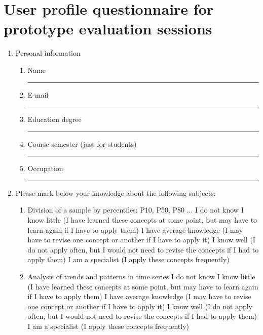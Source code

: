 \newpage

\chapter{User profile questionnaire for prototype evaluation sessions}
\label{chap:profile-form}

\begin{enumerate}
\item Personal information
  \begin{enumerate}
 \item Name
 \newline \rule[0pt]{300pt}{1pt}
 \item E-mail
 \newline \rule[0pt]{300pt}{1pt}
 \item Education degree
 \newline \rule[0pt]{300pt}{1pt}
 \item Course semester (just for students)
 \newline \rule[0pt]{300pt}{1pt}
 \item Occupation
 \newline \rule[0pt]{300pt}{1pt}
  \end{enumerate}
\item Please mark below your knowledge about the following subjects:
	\begin{enumerate}
   \item Division of a sample by percentiles: P10, P50, P80 ...
		\newline {} I do not know
     \newline {} I know little (I have learned these concepts at some point, but may have to learn again if I have to apply them)
     \newline {} I have average knowledge (I may have to revise one concept or another if I have to apply it)
     \newline {} I know well (I do not apply often, but I would not need to revise the concepts if I had to apply them)
     \newline {} I am a specialist (I apply these concepts frequently)
	  \newline 
   \item Analysis of trends and patterns in time series
   \newline {} I do not know
   \newline {} I know little (I have learned these concepts at some point, but may have to learn again if I have to apply them)
   \newline {} I have average knowledge (I may have to revise one concept or another if I have to apply it)
   \newline {} I know well (I do not apply often, but I would not need to revise the concepts if I had to apply them)
   \newline {} I am a specialist (I apply these concepts frequently)\\
      

\end{enumerate}
\end{enumerate}
